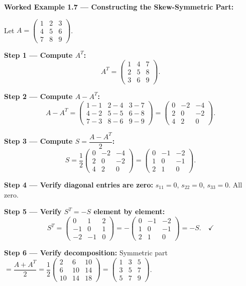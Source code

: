 \documentclass[12pt,a4paper]{article}
\begin{document}
\textbf{Worked Example 1.7 --- Constructing the Skew-Symmetric Part:}

Let $A = \begin{pmatrix} 1 & 2 & 3 \\ 4 & 5 & 6 \\ 7 & 8 & 9 \end{pmatrix}$.

\textbf{Step 1 --- Compute $A^T$:}
\[
A^T = \begin{pmatrix} 1 & 4 & 7 \\ 2 & 5 & 8 \\ 3 & 6 & 9 \end{pmatrix}.
\]

\textbf{Step 2 --- Compute $A - A^T$:}
\[
A - A^T = \begin{pmatrix}1-1&2-4&3-7\\4-2&5-5&6-8\\7-3&8-6&9-9\end{pmatrix} = \begin{pmatrix}0&-2&-4\\2&0&-2\\4&2&0\end{pmatrix}.
\]

\textbf{Step 3 --- Compute $S = \dfrac{A - A^T}{2}$:}
\[
S = \frac{1}{2}\begin{pmatrix}0&-2&-4\\2&0&-2\\4&2&0\end{pmatrix} = \begin{pmatrix}0&-1&-2\\1&0&-1\\2&1&0\end{pmatrix}.
\]

\textbf{Step 4 --- Verify diagonal entries are zero:} $s_{11} = 0$, $s_{22} = 0$, $s_{33} = 0$. All zero. \checkmark

\textbf{Step 5 --- Verify $S^T = -S$ element by element:}
\[
S^T = \begin{pmatrix}0&1&2\\-1&0&1\\-2&-1&0\end{pmatrix} = -\begin{pmatrix}0&-1&-2\\1&0&-1\\2&1&0\end{pmatrix} = -S. \quad \checkmark
\]

\textbf{Step 6 --- Verify decomposition:} Symmetric part $= \dfrac{A + A^T}{2} = \dfrac{1}{2}\begin{pmatrix}2&6&10\\6&10&14\\10&14&18\end{pmatrix} = \begin{pmatrix}1&3&5\\3&5&7\\5&7&9\end{pmatrix}$.
\end{document}
